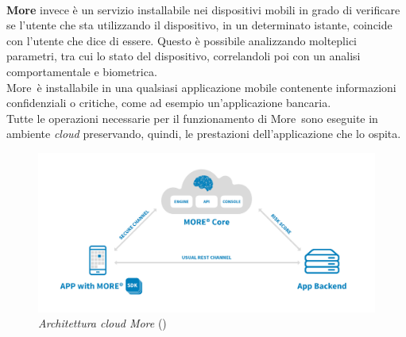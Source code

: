 \\
\textbf{More\textregistered} invece è un servizio installabile nei dispositivi mobili in grado di verificare se l'utente che sta utilizzando il dispositivo, in un determinato istante, coincide con l'utente che dice di essere. Questo è possibile analizzando molteplici parametri, tra cui lo stato del dispositivo, correlandoli poi con un analisi comportamentale e biometrica.\\
More\textregistered\ è installabile in una qualsiasi applicazione mobile contenente informazioni confidenziali o critiche, come ad esempio un'applicazione bancaria.\\
Tutte le operazioni necessarie per il funzionamento di More\textregistered\ sono eseguite in ambiente \textit{cloud} preservando, quindi, le prestazioni dell'applicazione che lo ospita.

\begin{figure}[h!]
	\centering
	\includegraphics[scale=0.15]{immagini/more-arc.png}
	\caption{\textit{Architettura cloud More\textregistered} ()}
\end{figure}
\newpage
